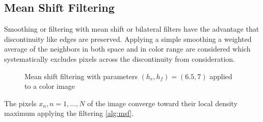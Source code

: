 \subsection{Mean Shift Filtering} %
\label{sub:mean_shift_filtering}
Smoothing or filtering with mean shift or bilateral filters have the
advantage that discontinuity like edges are preserved. Applying a
simple smoothing a weighted average of the neighbors in both space and
in color range are considered which systematically excludes pixels
across the discontinuity from consideration.

\begin{figure}[ht]
  \centering
  \caption{Mean shift filtering with parameters $(h_r, h_f) = (6.5,
    7)$ applied to a color image}
  \label{fig:filtsample}
\end{figure}

The pixels $x_n, n = 1, \ldots, N$ of the image converge toward their
local density maximum applying the filtering \autoref{alg:msf}.

